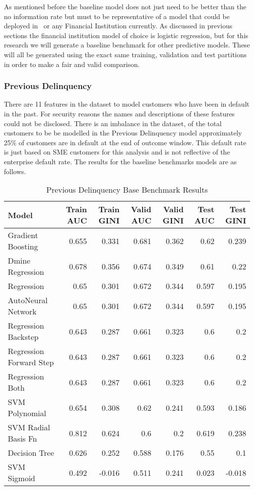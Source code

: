 As mentioned before the baseline model does not just need to be better than the no information rate but must to be representative of a model that could be deployed in \subjectname\ or any Financial Institution currently. As discussed in previous sections the financial institution model of choice is logistic regression, but for this research we will generate a baseline benchmark for other predictive models. These will all be generated using the exact same training, validation and test partitions in order to make a fair and valid comparison. 

\subsubsection{Previous Delinquency}

There are 11 features in the dataset to model customers who have been in default in the past. For security reasons the names and descriptions of these features could not be disclosed. There is an imbalance in the dataset, of the total customers to be be modelled in the Previous Delinquency model approximately 25\% of customers are in default at the end of outcome window. This default rate is just based on SME customers for this analysis and is not reflective of the enterprise default rate. The results for the baseline benchmarks models are as follows.
\begin{table}[H]
	\centering
	\resizebox{\textwidth}{!}
	{
	\begin{tabular}{l | r | r| r |r| r|r}
		\hline
		\textbf{Model} & \textbf{Train AUC} & \textbf{Train GINI} & \textbf{Valid AUC} & \textbf{Valid GINI}& \textbf{Test AUC} & \textbf{Test GINI}\\
		\hline
		\cellcolor{green!25}Gradient Boosting & \cellcolor{green!25}0.655 & \cellcolor{green!25}0.331 & \cellcolor{green!25}0.681 & \cellcolor{green!25}0.362 & \cellcolor{green!25}0.62 & \cellcolor{green!25}0.239 \\
		Dmine Regression & 0.678 & 0.356 & 0.674 & 0.349 & 0.61 & 0.22 \\
		Regression & 0.65 & 0.301 & 0.672 & 0.344 & 0.597 & 0.195 \\
		AutoNeural Network & 0.65 & 0.301 & 0.672 & 0.344 & 0.597 & 0.195 \\
		Regression Backstep & 0.643 & 0.287 & 0.661 & 0.323 & 0.6 & 0.2 \\
		Regression Forward Step & 0.643 & 0.287 & 0.661 & 0.323 & 0.6 & 0.2 \\
		Regression Both & 0.643 & 0.287 & 0.661 & 0.323 & 0.6 & 0.2 \\
		SVM Polynomial & 0.654 & 0.308 & 0.62 & 0.241 & 0.593 & 0.186 \\
		SVM Radial Basis Fn & 0.812 & 0.624 & 0.6 & 0.2 & 0.619 & 0.238 \\
		Decision Tree & 0.626 & 0.252 & 0.588 & 0.176 & 0.55 & 0.1 \\
		SVM Sigmoid & 0.492 & -0.016 & 0.511 & 0.241 & 0.023 & -0.018 \\
		\hline
	\end{tabular}
	}
	\caption{Previous Delinquency Base Benchmark Results}
	\label{table:prevdelinqbase}
\end{table}

